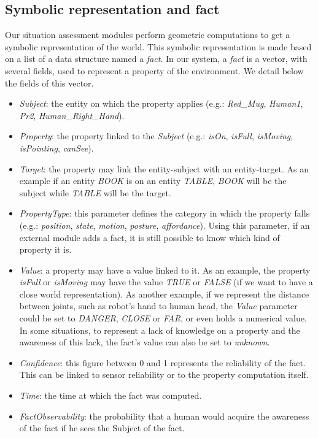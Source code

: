 \documentclass[a4paper]{article}
\begin{document}
\subsection{Symbolic representation and fact}
Our situation assessment modules perform geometric computations to get a symbolic representation of the world. This symbolic representation is made based on a list of a data structure named a \textit{fact}. In our system, a \textit{fact} is a vector, with several fields, used to represent a property of the environment. We detail below the fields of this vector.
\begin{itemize}
\item \textit{Subject}: the entity on which the property applies (e.g.: \textit{Red\_Mug}, \textit{Human1}, \textit{Pr2}, \textit{Human\_Right\_Hand}).
\item \textit{Property}: the property linked to the \textit{Subject} (e.g.: \textit{isOn}, \textit{isFull}, \textit{isMoving}, \textit{isPointing}, \textit{canSee}).
\item \textit{Target}: the property may link the entity-subject with an entity-target. As an example if an entity \textit{BOOK} is on an entity \textit{TABLE}, \textit{BOOK} will be the subject while \textit{TABLE} will be the target.
\item \textit{PropertyType}: this parameter defines the category in which the property falls (e.g.: \textit{position}, \textit{state}, \textit{motion}, \textit{posture}, \textit{affordance}). Using this parameter, if an external module adds a fact, it is still possible to know which kind of property it is.
\item \textit{Value}: a property may have a value linked to it. As an example, the property \textit{isFull} or \textit{isMoving} may have the value \textit{TRUE} or \textit{FALSE} (if we want to have a close world representation). As another example, if we represent the distance between joints, such as robot's hand to human head, the \textit{Value} parameter could be set to \textit{DANGER}, \textit{CLOSE} or \textit{FAR}, or even holds a numerical value.
In some situations, to represent a lack of knowledge on a property and the awareness of this lack, the fact's value can also be set to \textit{unknown}.
\item \textit{Confidence}: this figure between 0 and 1 represents the reliability of the fact. This can be linked to sensor reliability or to the property computation itself.
\item \textit{Time}: the time at which the fact was computed.
\item \textit{FactObservability}: the probability that a human would acquire the awareness of the fact if he sees the Subject of the fact. 
\end{itemize}
\end{document}
